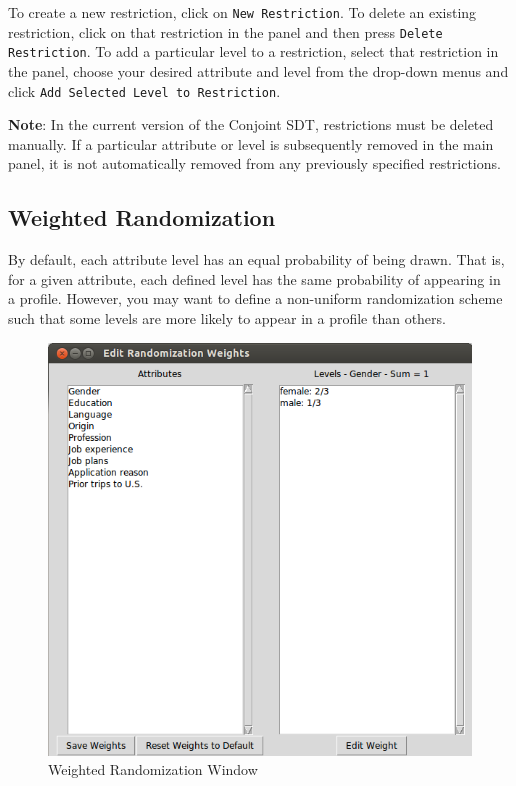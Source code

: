 \documentclass[12pt]{article}
\begin{document}
To create a new restriction, click on \texttt{New Restriction}. To delete an existing restriction, click on that restriction in the panel and then press \texttt{Delete Restriction}. To add a particular level to a restriction, select that restriction in the panel, choose your desired attribute and level from the drop-down menus and click \texttt{Add Selected Level to Restriction}.

\textbf{Note}: In the current version of the Conjoint SDT, restrictions must be deleted manually. If a particular attribute or level is subsequently removed in the main panel, it is not automatically removed from any previously specified restrictions.

\subsection{Weighted Randomization}

By default, each attribute level has an equal probability of being drawn. That is, for a given attribute, each defined level has the same probability of appearing in a profile. However, you may want to define a non-uniform randomization scheme such that some levels are more likely to appear in a profile than others. 

\begin{figure}[ht!]
\centering\includegraphics[scale=.6]{graphics/weight_screen.png}
\caption{Weighted Randomization Window}
\end{figure}
\end{document}
